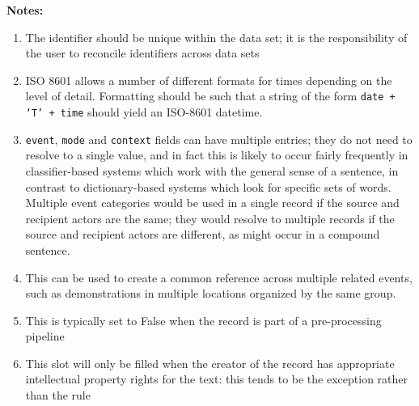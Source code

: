 \documentclass[11pt]{report}
\begin{document}
\noindent \textbf{Notes:}
\begin{enumerate}
\item The identifier should be unique within the data set; it is the responsibility of the user to reconcile identifiers across data sets

\item ISO 8601 allows a number of different formats for times depending on the level of detail. Formatting should be such that a string of the form \texttt{date + `T' + time} should yield an ISO-8601 datetime.
\item  \texttt{event}, \texttt{mode} and \texttt{context} fields can have multiple entries; they do not need to resolve to a single value, and in fact this is likely to occur fairly frequently in classifier-based systems which work with the general sense of a sentence, in contrast to dictionary-based systems which look for specific sets of words. Multiple event categories would be used in a single record if the source and recipient actors are the same; they would resolve to multiple records if the source and recipient actors are different, as might occur in a compound sentence.

\item  This can be used to create a common reference across multiple related events, such as demonstrations in multiple locations organized by the same group.

\item This is typically set to False when the record is part of a pre-processing pipeline

\item This slot will only be filled when the creator of the record has appropriate intellectual property rights for the text: this tends to be the exception rather than the rule
\end{enumerate}


\clearpage
\end{document}
